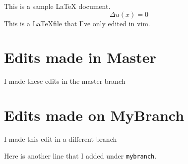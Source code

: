 \documentclass[11pt,letterpaper]{article}
\begin{document}
	This is a sample LaTeX document.
	\begin{equation} \Delta u(x)=0\end{equation}
	This is a \LaTeX file that I've only edited in vim.	
	
	\section{Edits made in Master}
	I made these edits in the master branch

	\section{Edits made on MyBranch}
	I made this edit in a different branch

	Here is another line that I added under \verb|mybranch|. 
\end{document}
